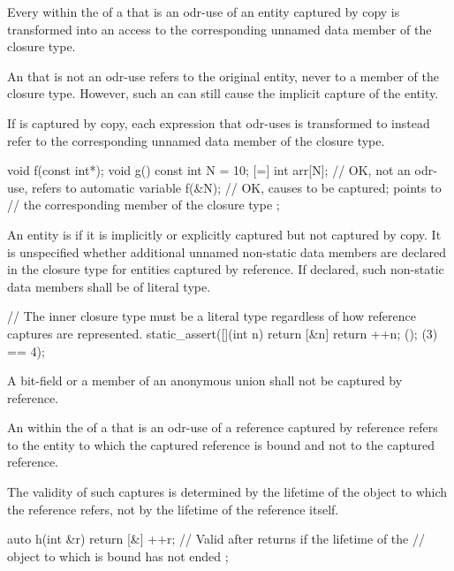 \pnum
Every  within the  of a
 that is an odr-use of an
entity captured by copy is transformed into an access to the corresponding unnamed data
member of the closure type.
\begin{note}
An  that is not an odr-use refers to
the original entity, never to a member of the closure type.
However, such
an  can still cause the implicit capture of the
entity.
\end{note}
If  is captured by copy, each expression that odr-uses  is
transformed to instead refer to the corresponding unnamed data member of the closure type.
\begin{example}
\begin{codeblock}
void f(const int*);
void g() {
  const int N = 10;
  [=] {
    int arr[N];     // OK, not an odr-use, refers to automatic variable
    f(&N);          // OK, causes  to be captured;  points to
                    // the corresponding member of the closure type
  };
}
\end{codeblock}
\end{example}

\pnum
An entity is  if it is implicitly or explicitly
captured but not captured by copy. It is unspecified whether additional unnamed
non-static data members are declared in the closure type for entities captured by
reference.
If declared, such non-static data members shall be of literal type.
\begin{example}
\begin{codeblock}
// The inner closure type must be a literal type regardless of how reference captures are represented.
static_assert([](int n) { return [&n] { return ++n; }(); }(3) == 4);
\end{codeblock}
\end{example}
A bit-field or a member of an anonymous union
shall not be captured by reference.

\pnum
An  within
the  of a 
that is an odr-use of a reference captured by reference
refers to the entity to which the captured reference is bound and
not to the captured reference.
\begin{note}
The validity of such captures is determined by
the lifetime of the object to which the reference refers,
not by the lifetime of the reference itself.
\end{note}
\begin{example}
\begin{codeblock}
auto h(int &r) {
  return [&] {
    ++r;            // Valid after  returns if the lifetime of the
                    // object to which  is bound has not ended
  };
}
\end{codeblock}
\end{example}

